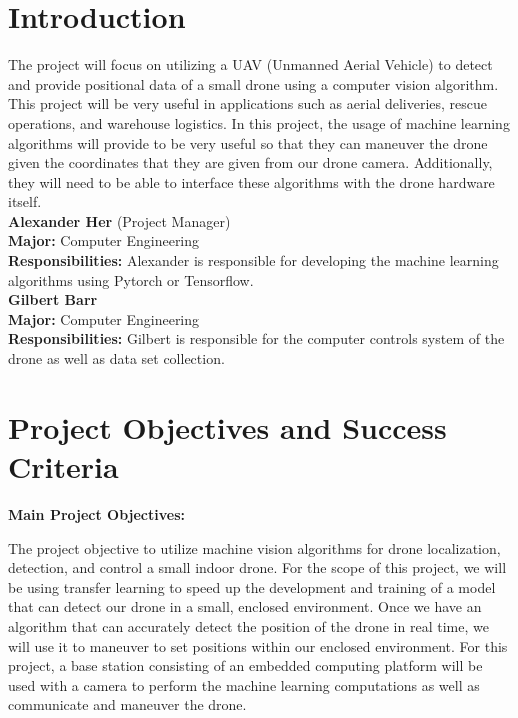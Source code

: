 \documentclass[12pt,onecolumn]{IEEEtran}			%
\begin{document}
 
 \section{Introduction}
The project will focus on utilizing a UAV (Unmanned Aerial Vehicle) to detect and provide positional data of a small drone using a computer vision algorithm. This project will be very useful in applications such as aerial deliveries, rescue operations, and warehouse logistics. In this project, the usage of machine learning algorithms will provide to be very useful so that they can maneuver the drone given the coordinates that they are given from our drone camera. Additionally, they will need to be able to interface these algorithms with the drone hardware itself. \\


\textbf{Alexander Her} (Project Manager)\\ 
\textbf{Major:} Computer Engineering\\
\textbf{Responsibilities:} Alexander is responsible for developing the machine learning algorithms using Pytorch or Tensorflow. \\

\textbf{Gilbert Barr}\\
\textbf{Major:} Computer Engineering\\ 
\textbf{Responsibilities:} Gilbert is responsible for the computer controls system of the drone as well as data set collection. \\ 
 

 
 \section{Project Objectives and Success Criteria}
 
 \textbf{Main Project Objectives:}

 \begin{description}
 
  The project objective to utilize machine vision algorithms for drone localization, detection, and control a small indoor drone. For the scope of this project, we will be using transfer learning to speed up the development and training of a model that can detect our drone in a small, enclosed environment. Once we have an algorithm that can accurately detect the position of the drone in real time, we will use it to maneuver to set positions within our enclosed environment. For this project, a base station consisting of an embedded computing platform will be used with a camera to perform the machine learning computations as well as communicate and maneuver the drone.
  
\end{description} 
\vspace{12pt} 
\end{document}
